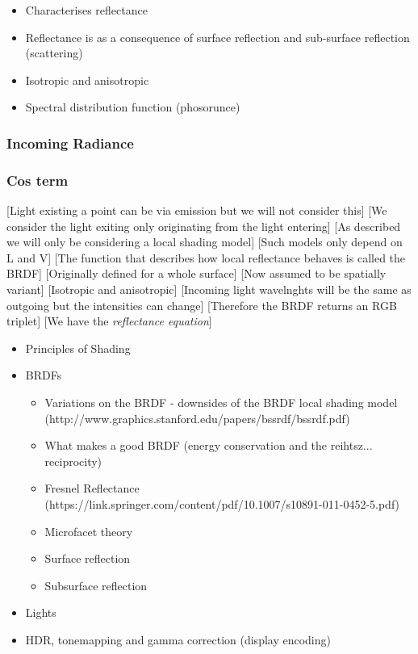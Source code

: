 \begin{itemize}
	\item Characterises reflectance
	\item Reflectance is as a consequence of surface reflection and sub-surface reflection (scattering)
	\item Isotropic and anisotropic
	\item Spectral distribution function (phosorunce)
\end{itemize}

\subsubsection{Incoming Radiance}

\subsubsection{Cos term}

[Light existing a point can be via emission but we will not consider this]
[We consider the light exiting only originating from the light entering]
[As described we will only be considering a local shading model]
[Such models only depend on L and V]
[The function that describes how local reflectance behaves is called the BRDF]
[Originally defined for a whole surface]
[Now assumed to be spatially variant]
[Isotropic and anisotropic]
[Incoming light wavelnghts will be the same as outgoing but the intensities can change]
[Therefore the BRDF returns an RGB triplet]
[We have the \textit{reflectance equation}]


\begin{itemize}
	\item Principles of Shading
	\item BRDFs
	\begin{itemize}
		\item Variations on the BRDF - downsides of the BRDF local shading model (http://www.graphics.stanford.edu/papers/bssrdf/bssrdf.pdf)
		\item What makes a good BRDF (energy conservation and the reihtsz... reciprocity)
		\item Fresnel Reflectance (https://link.springer.com/content/pdf/10.1007/s10891-011-0452-5.pdf)
		\item Microfacet theory
		\item Surface reflection
		\item Subsurface reflection
	\end{itemize}
	\item Lights
	\item HDR, tonemapping and gamma correction (display encoding)
\end{itemize}


